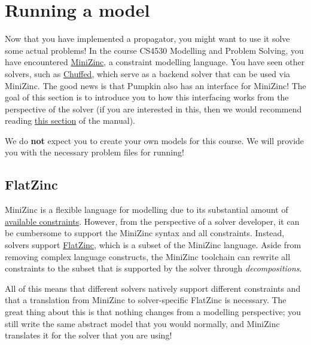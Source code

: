 \documentclass{article}
\begin{document}
\section{Running a model}
    Now that you have implemented a propagator, you might want to use it solve some actual problems!
    In the course CS4530 Modelling and Problem Solving, you have encountered \href{https://www.minizinc.org/}{MiniZinc}, a constraint modelling language.
    You have seen other solvers, such as \href{https://github.com/chuffed/chuffed}{Chuffed}, which serve as a backend solver that can be used via MiniZinc.
    The good news is that Pumpkin also has an interface for MiniZinc!
    The goal of this section is to introduce you to how this interfacing works from the perspective of the solver (if you are interested in this, then we would recommend reading \href{https://docs.minizinc.dev/en/stable/fzn-spec.html}{this section} of the manual).
    \begin{Note}
        We do \textbf{not} expect you to create your own models for this course. We will provide you with the necessary problem files for running!
    \end{Note}

    \subsection{FlatZinc}
        MiniZinc is a flexible language for modelling due to its substantial amount of \href{https://docs.minizinc.dev/en/stable/lib-globals.html}{available constraints}.
        However, from the perspective of a solver developer, it can be cumbersome to support the MiniZinc syntax and all constraints.
        Instead, solvers support \href{https://docs.minizinc.dev/en/stable/fzn-spec.html#specification-of-flatzinc}{FlatZinc}, which is a subset of the MiniZinc language.
        Aside from removing complex language constructs, the MiniZinc toolchain can rewrite all constraints to the subset that is supported by the solver through \textit{decompositions}.
        
        All of this means that different solvers natively support different constraints and that a translation from MiniZinc to solver-specific FlatZinc is necessary.
        The great thing about this is that nothing changes from a modelling perspective; you still write the same abstract model that you would normally, and MiniZinc translates it for the solver that you are using!
\end{document}
